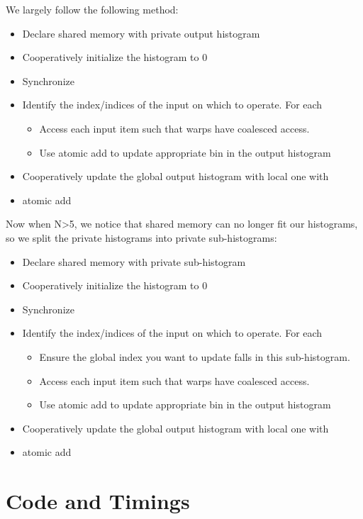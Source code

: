 We largely follow the following method:

\begin{itemize}
\item Declare shared memory with private output histogram
\item Cooperatively initialize the histogram to 0
\item Synchronize
\item Identify the index/indices of the input on which to operate. For each 
\begin{itemize}
\item Access each input item such that warps have coalesced access.
\item Use atomic add to update appropriate bin in the output histogram
\end{itemize}
\item Cooperatively update the global output histogram with local one with
\item atomic add
\end{itemize}

Now when N>5, we notice that shared memory can no longer fit our histograms, so we split the private histograms into private sub-histograms:

\begin{itemize}
\item Declare shared memory with private sub-histogram
\item Cooperatively initialize the histogram to 0
\item Synchronize
\item Identify the index/indices of the input on which to operate. For each 
\begin{itemize}
\item Ensure the global index you want to update falls in this sub-histogram.
\item Access each input item such that warps have coalesced access.
\item Use atomic add to update appropriate bin in the output histogram
\end{itemize}
\item Cooperatively update the global output histogram with local one with
\item atomic add
\end{itemize}

\section {Code and Timings}


